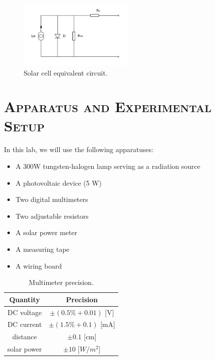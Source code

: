 \documentclass[a4paper,12pt]{article}
\begin{document}
\begin{figure}[htb] 
    \centering
    \includegraphics[width=0.5\textwidth]{Fig3} 
    \caption{Solar cell equivalent circuit.\cite{labmanual}} 
\end{figure}

\section{\textsc{Apparatus and Experimental Setup}}
In this lab, we will use the following apparatuses:
\begin{itemize}
\item A 300W tungsten-halogen lamp serving as a radiation source
\item A photovoltaic device (5 W)
\item Two digital multimeters
\item Two adjustable resistors
\item A solar power meter
\item A measuring tape
\item A wiring board
\end{itemize}


\begin{table}[H]
\begin{center}
\begin{tabular}{|c|c|}
\hline
Quantity & Precision \\ \hline
DC voltage & $\pm(0.5\% + 0.01)$ {[}V{]} \\ \hline
DC current & $\pm(1.5\% + 0.1)$ {[}mA{]} \\ \hline
distance & $\pm 0.1 $ {[}cm{]} \\ \hline
solar power & $\pm 10$ {[}$W/m^2${]} \\ \hline
\end{tabular}
\caption{Multimeter precision.}
\end{center}
\end{table}
\end{document}
